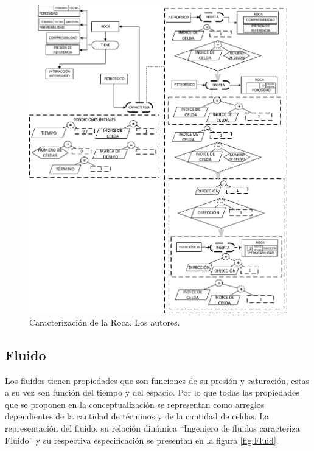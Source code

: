 \begin{figure}[b]
	\centering%
	\includegraphics[width=0.90\linewidth]{Fig/Rock.pdf}%
	\caption{Caracterización de la Roca. Los autores.} \label{fig:Rock}
\end{figure}

\subsection{Fluido}\label{sec:PS_Phase}

Los fluidos tienen propiedades que son funciones de su presión y saturación, estas a su vez son función del tiempo y del espacio. Por lo que todas las propiedades que se proponen en la conceptualización se representan como arreglos dependientes de la cantidad de términos y de la cantidad de celdas. La representación del fluido, su relación dinámica ``Ingeniero de fluidos caracteriza Fluido'' y su respectiva especificación se presentan en la figura \ref{fig:Fluid}.\\

